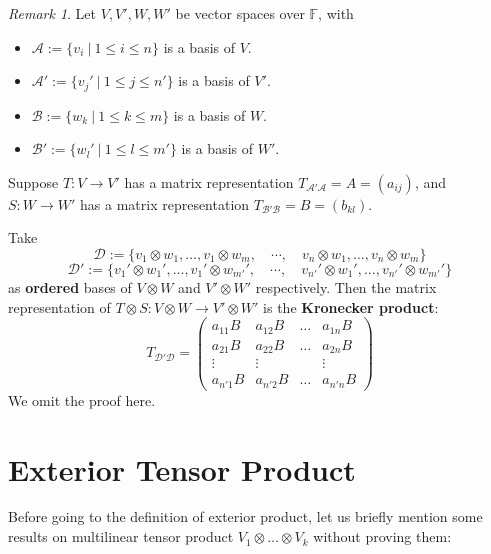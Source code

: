 \documentclass[11pt,openany]{book}
\theoremstyle{plain}
\theoremstyle{definition}
\theoremstyle{remark}
\newtheorem{remark}[remark]{Remark}
\begin{document}
\begin{remark}
    Let $V, V', W, W'$ be vector spaces over $\mathbb{F}$, with
    \begin{itemize}
        \item $\mathcal{A} := \{v_i\ |\ 1 \leq i \leq n\}$ is a basis of $V$.
        \item $\mathcal{A}' := \{v_j' \ |\ 1 \leq j \leq n'\}$ is a basis of $V'$.
        \item $\mathcal{B} := \{w_k \ |\ 1 \leq k \leq m\}$ is a basis of $W$.
        \item $\mathcal{B}' := \{w_l' \ |\ 1 \leq l \leq m'\}$ is a basis of $W'$.
    \end{itemize}
    Suppose $T:V \to V'$ has a matrix representation $T_{\mathcal{A}'\mathcal{A}} = A = (a_{ij})$, and $S: W \to W'$ has a matrix representation $T_{\mathcal{B}'\mathcal{B}} = B = (b_{kl})$. 
    
    Take
    $$\mathcal{D} := \{v_1 \otimes w_1, \dots, v_1 \otimes w_m, \quad \cdots, \quad v_n \otimes w_1, \dots, v_n \otimes w_m\}$$
    $$\mathcal{D}' := \{v_1' \otimes w_1', \dots, v_1' \otimes w_{m'}', \quad \cdots, \quad v_{n'}' \otimes w_1', \dots, v_{n'}' \otimes w_{m'}'\}$$
    as {\bf ordered} bases of  $V \otimes W$ and $V' \otimes W'$ respectively. Then the matrix representation of 
    $T \otimes S: V \otimes W \to V' \otimes W'$ is the {\bf Kronecker product}:
    $$T_{\mathcal{D}'\mathcal{D}} = \begin{pmatrix}
        a_{11}B & a_{12}B & \dots & a_{1n}B \\
        a_{21}B & a_{22}B & \dots & a_{2n}B \\
        \vdots & \vdots & & \vdots \\ 
        a_{n'1}B & a_{n'2}B & \dots & a_{n'n}B 
    \end{pmatrix}$$
    We omit the proof here.
\end{remark}

\section{Exterior Tensor Product}
Before going to the definition of exterior product, let us briefly mention some results on multilinear tensor product $V_1 \otimes \dots \otimes V_k$ without proving them:
\end{document}
